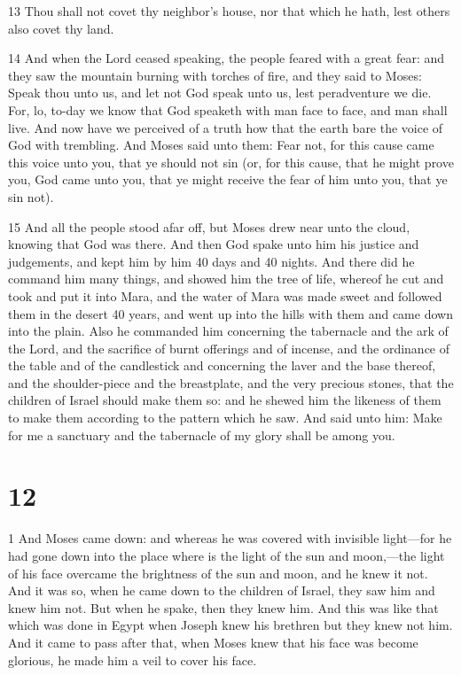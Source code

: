 \par 13 Thou shall not covet thy neighbor's house, nor that which he hath, lest others also covet thy land.

\par 14 And when the Lord ceased speaking, the people feared with a great fear: and they saw the mountain burning with torches of fire, and they said to Moses: Speak thou unto us, and let not God speak unto us, lest peradventure we die. For, lo, to-day we know that God speaketh with man face to face, and man shall live. And now have we perceived of a truth how that the earth bare the voice of God with trembling. And Moses said unto them: Fear not, for this cause came this voice unto you, that ye should not sin (or, for this cause, that he might prove you, God came unto you, that ye might receive the fear of him unto you, that ye sin not). 

\par 15 And all the people stood afar off, but Moses drew near unto the cloud, knowing that God was there. And then God spake unto him his justice and judgements, and kept him by him 40 days and 40 nights. And there did he command him many things, and showed him the tree of life, whereof he cut and took and put it into Mara, and the water of Mara was made sweet and followed them in the desert 40 years, and went up into the hills with them and came down into the plain. Also he commanded him concerning the tabernacle and the ark of the Lord, and the sacrifice of burnt offerings and of incense, and the ordinance of the table and of the candlestick and concerning the laver and the base thereof, and the shoulder-piece and the breastplate, and the very precious stones, that the children of Israel should make them so: and he shewed him the likeness of them to make them according to the pattern which he saw. And said unto him: Make for me a sanctuary and the tabernacle of my glory shall be among you.

\chapter{12}

\par 1 And Moses came down: and whereas he was covered with invisible light—for he had gone down into the place where is the light of the sun and moon,—the light of his face overcame the brightness of the sun and moon, and he knew it not. And it was so, when he came down to the children of Israel, they saw him and knew him not. But when he spake, then they knew him. And this was like that which was done in Egypt when Joseph knew his brethren but they knew not him. And it came to pass after that, when Moses knew that his face was become glorious, he made him a veil to cover his face.

